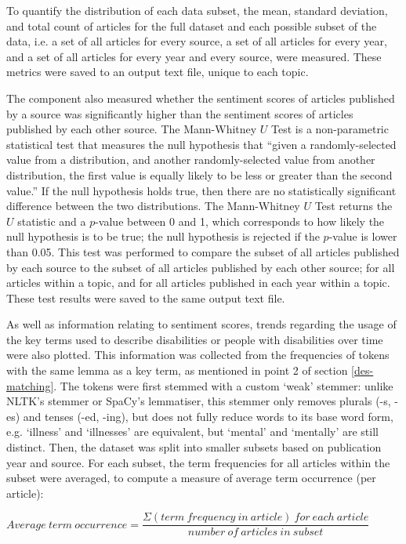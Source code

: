 \documentclass{report}
\begin{document}
To quantify the distribution of each data subset, the mean, standard deviation, and total count of articles for the full dataset and each possible subset of the data, i.e. a set of all articles for every source, a set of all articles for every year, and a set of all articles for every year and every source, were measured. 
These metrics were saved to an output text file, unique to each topic.

The component also measured whether the sentiment scores of articles published by a source was significantly higher than the sentiment scores of articles published by each other source. 
The Mann-Whitney $U$ Test \cite{mann1947test} is a non-parametric statistical test that measures the null hypothesis that ``given a randomly-selected value from a distribution, and another randomly-selected value from another distribution, the first value is equally likely to be less or greater than the second value.''
If the null hypothesis holds true, then there are no statistically significant difference between the two distributions.
The Mann-Whitney $U$ Test returns the $U$ statistic and a $p$-value between 0 and 1, which corresponds to how likely the null hypothesis is to be true; the null hypothesis is rejected if the $p$-value is lower than 0.05.
This test was performed to compare the subset of all articles published by each source to the subset of all articles published by each other source; for all articles within a topic, and for all articles published in each year within a topic.
These test results were saved to the same output text file.

As well as information relating to sentiment scores, trends regarding the usage of the key terms used to describe disabilities or people with disabilities over time were also plotted.
This information was collected from the frequencies of tokens with the same lemma as a key term, as mentioned in point 2 of section \ref{des-matching}.
The tokens were first stemmed with a custom `weak' stemmer: unlike NLTK's stemmer or SpaCy's lemmatiser, this stemmer only removes plurals (-s, -es) and tenses (-ed, -ing), but does not fully reduce words to its base word form, e.g. `illness' and `illnesses' are equivalent, but `mental' and `mentally' are still distinct.
Then, the dataset was split into smaller subsets based on publication year and source.
For each subset, the term frequencies for all articles within the subset were averaged, to compute a measure of average term occurrence (per article):

\begin{center}
	$Average \ term \ occurrence = \dfrac{\Sigma (term \ frequency \ in \ article) \ for \ each \ article}{number \ of \ articles \ in \ subset}$
\end{center}
\end{document}
